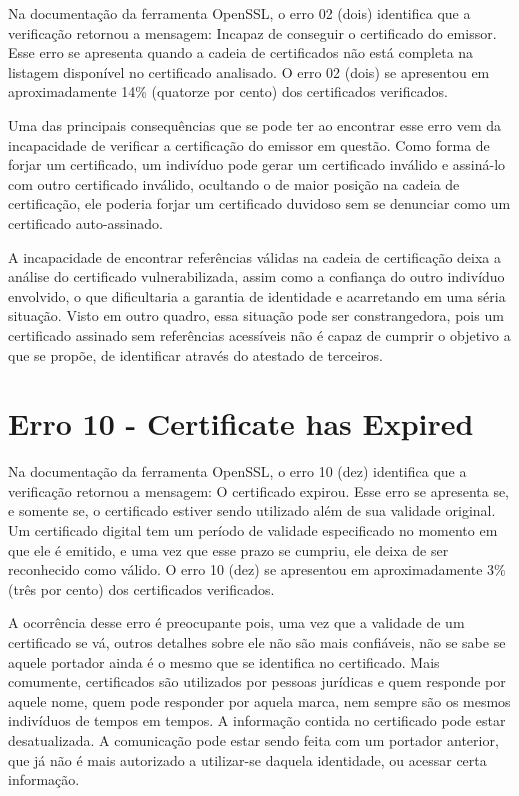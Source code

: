 	Na documentação da ferramenta OpenSSL, o erro 02 (dois) identifica que a verificação retornou a mensagem: Incapaz de conseguir o certificado do emissor.
	Esse erro se apresenta quando a cadeia de certificados não está completa na listagem disponível no certificado analisado. O erro 02 (dois) se apresentou em aproximadamente 14\% (quatorze por cento) dos certificados verificados.

	Uma das principais consequências que se pode ter ao encontrar esse erro vem da incapacidade de verificar a certificação do emissor em questão. Como forma de forjar um certificado, um indivíduo pode gerar um certificado inválido e assiná-lo com outro certificado inválido, ocultando o de maior posição na cadeia de certificação, ele poderia forjar um certificado duvidoso sem se denunciar como um certificado auto-assinado.

	A incapacidade de encontrar referências válidas na cadeia de certificação deixa a análise do certificado vulnerabilizada, assim como a confiança do outro indivíduo envolvido, o que dificultaria a garantia de identidade e acarretando em uma séria situação. Visto em outro quadro, essa situação pode ser constrangedora, pois um certificado assinado sem referências acessíveis não é capaz de cumprir o objetivo a que se propõe, de identificar através do atestado de terceiros.

\section[Erro 10 - Certificate has Expired]{Erro 10 - Certificate has Expired}

	Na documentação da ferramenta OpenSSL, o erro 10 (dez) identifica que a verificação retornou a mensagem: O certificado expirou.
	Esse erro se apresenta se, e somente se, o certificado estiver sendo utilizado além de sua validade original. Um certificado digital tem um período de validade especificado no momento em que ele é emitido, e uma vez que esse prazo se cumpriu, ele deixa de ser reconhecido como válido. O erro 10 (dez) se apresentou em aproximadamente 3\% (três por cento) dos certificados verificados.
	
	A ocorrência desse erro é preocupante pois, uma vez que a validade de um certificado se vá, outros detalhes sobre ele não são mais confiáveis, não se sabe se aquele portador ainda é o mesmo que se identifica no certificado. Mais comumente, certificados são utilizados por pessoas jurídicas e quem responde por aquele nome, quem pode responder por aquela marca, nem sempre são os mesmos indivíduos de tempos em tempos.
	A informação contida no certificado pode estar desatualizada. A comunicação pode estar sendo feita com um portador anterior, que já não é mais autorizado a utilizar-se daquela identidade, ou acessar certa informação.

